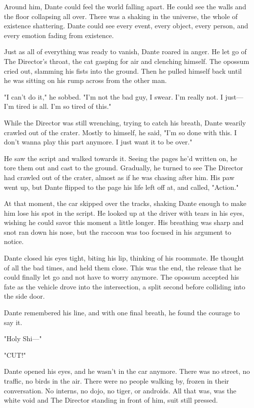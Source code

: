 Around him, Dante could feel the world falling apart. He could see the walls and the floor collapsing all over. There was a shaking in the universe, the whole of existence shattering. Dante could see every event, every object, every person, and every emotion fading from existence.

Just as all of everything was ready to vanish, Dante roared in anger. He let go of The Director's throat, the cat gasping for air and clenching himself. The opossum cried out, slamming his fists into the ground. Then he pulled himself back until he was sitting on his rump across from the other man.

"I can't do it," he sobbed. "I'm not the bad guy, I swear. I'm really not. I just--- I'm tired is all. I'm so tired of this."

While the Director was still wrenching, trying to catch his breath, Dante wearily crawled out of the crater. Mostly to himself, he said, "I'm so done with this. I don't wanna play this part anymore. I just want it to be over."

He saw the script and walked towards it. Seeing the pages he'd written on, he tore them out and cast to the ground. Gradually, he turned to see The Director had crawled out of the crater, almost as if he was chasing after him. His paw went up, but Dante flipped to the page his life left off at, and called, "Action."

At that moment, the car skipped over the tracks, shaking Dante enough to make him lose his spot in the script. He looked up at the driver with tears in his eyes, wishing he could savor this moment a little longer. His breathing was sharp and snot ran down his nose, but the raccoon was too focused in his argument to notice.

Dante closed his eyes tight, biting his lip, thinking of his roommate. He thought of all the bad times, and held them close. This was the end, the release that he could finally let go and not have to worry anymore. The opossum accepted his fate as the vehicle drove into the intersection, a split second before colliding into the side door.

Dante remembered his line, and with one final breath, he found the courage to say it.

"Holy Shi---"

"CUT!"

Dante opened his eyes, and he wasn't in the car anymore. There was no street, no traffic, no birds in the air. There were no people walking by, frozen in their conversation. No interns, no dojo, no tiger, or androids. All that was, was the white void and The Director standing in front of him, suit still pressed.


